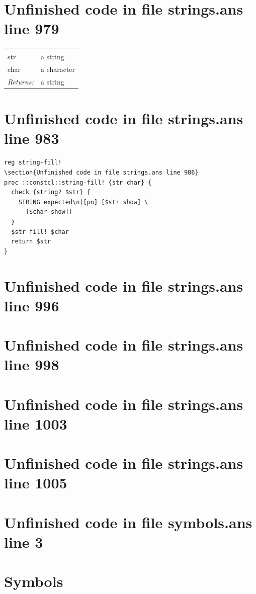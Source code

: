 \documentclass[twoside,9pt]{report}
\begin{document}
\section{Unfinished code in file strings.ans line 979}
\noindent\begin{tabular}{ |p{1.9cm} p{8cm}| }
\hline
\rowcolor[HTML]{CCCCCC} \multicolumn{2}{|l|}{\bf string-fill! (public)} \\
str & a string \\
char & a character \\
\textit{Returns:} & a string \\
\hline
\end{tabular}
\section{Unfinished code in file strings.ans line 983}
\begin{lstlisting}
reg string-fill!
\section{Unfinished code in file strings.ans line 986}
proc ::constcl::string-fill! {str char} {
  check {string? $str} {
    STRING expected\n([pn] [$str show] \
      [$char show])
  }
  $str fill! $char
  return $str
}
\end{lstlisting}
\section{Unfinished code in file strings.ans line 996}
\section{Unfinished code in file strings.ans line 998}
\section{Unfinished code in file strings.ans line 1003}
\section{Unfinished code in file strings.ans line 1005}
\section{Unfinished code in file symbols.ans line 3}
\section{Symbols}
\label{symbols}
\end{document}

